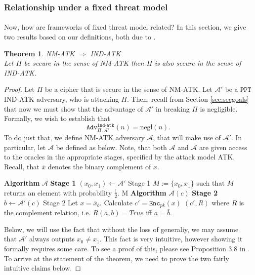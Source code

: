 \documentclass{article}
\newtheorem{theorem}{Theorem}[section]
\theoremstyle{definition}
\theoremstyle{example}
\newcommand{\Enc}{\texttt{Enc}}
\newcommand{\A}{\mathcal{A}}
\newcommand{\PPT}{\texttt{PPT}}
\newcommand{\negl}{\text{negl}}
\newcommand{\Adv}[2]{\texttt{Adv}^{\texttt{#1}}_{#2}}
\begin{document}
\subsubsection{Relationship under a fixed threat model}
\paragraph{} Now, how are frameworks of fixed threat model related? In this
section, we give two results based on our definitions, both due to \cite{bellaresecurityrelations}.
\begin{theorem}{NM-ATK $\Rightarrow$ IND-ATK}\\
  \label{thm:nm_imply_ind}
  Let $\Pi$ be secure in the sense of NM-ATK then $\Pi$ is also secure in the
  sense of IND-ATK.
\end{theorem}
\begin{proof}
  Let $\Pi$ be a cipher that is secure in the sense of NM-ATK. Let $\A'$ be
  a $\PPT$ IND-ATK adversary, who is attacking $\Pi$. Then, recall from Section
  \ref{sec:secgoals} that now we must show that the advantage of $\A'$ in
  breaking $\Pi$ is negligible. Formally, we wish to establish that
  \[
    \Adv{ind-atk}{\Pi, \A'}(n) = \negl(n).
  \]
  To do just that, we define NM-ATK adversary $\A$, that will make use of $\A'$.
  In particular, let $\A$ be defined as below. Note, that both $\A$ and $\A$ are
  given access to the oracles in the appropriate stages, specified by the attack
  model ATK. Recall, that $\bar{x}$ denotes the binary complement of $x$.\\
  \begin{algorithmic}
    \State \textbf{Algorithm} $\A$ \textbf{Stage 1}
    \State $(x_0, x_1) \leftarrow \A'$ Stage 1
    \State $M:= \{x_0, x_1\}$ such that $M$ returns an element with probability $\frac12$.
    \State \Return M
    \State
    \State \textbf{Algorithm} $\A(c)$ \textbf{Stage 2}
    \State $b \leftarrow \A'(c)$ Stage 2
    \State Let $x = \bar{x}_b$. Calculate $c' = \Enc_{pk}(x)$
    \State \Return $(c', R)$ where $R$ is the complement relation, i.e. $R(a,
    b) = True$ iff $a = \bar{b}$.
    \State
  \end{algorithmic}
  Below, we will use the fact that without the loss of generaliy, we may assume
  that $\A'$ always outputs $x_0 \neq x_1$. This fact is very intuitive, however
  showing it formally requires some care. To see a proof of this, please see
  Proposition 3.8 in \cite{bellaresecurityrelations}. To arrive at the statement
  of the theorem, we need to prove the two fairly intuitive claims below.

\end{proof}
\end{document}
